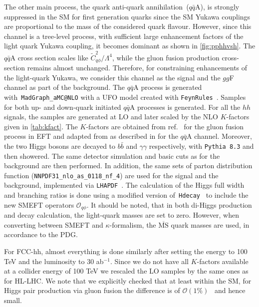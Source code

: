 The other main process, the quark anti-quark annihilation~($q\bar q$A), is strongly suppressed in the SM for first generation quarks since the SM Yukawa couplings are proportional to the mass of the considered quark flavour. However, since this channel is a tree-level process, with sufficient large enhancement factors of the light quark Yukawa coupling, it becomes dominant as shown in \autoref{fig:pphhvsh}. The $q\bar q$A cross section scales like $\tilde{C}_{q\phi}^2/\Lambda^4$,  while the gluon fusion production cross-section remains almost unchanged. Therefore, for constraining enhancements of the light-quark Yukawa, we consider this channel as the signal and the $gg$F channel as part of the background. The $q\bar q$A process is generated with~\texttt{MadGraph\_aMC@NLO} with a UFO model created with \texttt{FeynRules}~\cite{Alloul:2013bka}. Samples for both up- and down-quark initiated $q\bar q$A processes is generated. For all the $hh$ signals, the samples are generated at LO and later scaled by the NLO $K$-factors given in \autoref{tab:kfact}. The $K$-factors are obtained from ref.~\cite{Buchalla:2018yce} for the gluon fusion process in EFT and adapted from \cite{Dicus:1998hs,Balazs:1998sb, Harlander:2003ai} as described in \cite{Alasfar:2019pmn} for the $q\bar q$A channel. Moreover, the two Higgs bosons are decayed to $b\bar b$ and $\gamma\gamma$ respectively, with \texttt{Pythia 8.3} and then showered. The same detector simulation and basic cuts as for the background are then performed. In addition, the same sets of parton distribution function (\texttt{NNPDF31\_nlo\_as\_0118\_nf\_4}) are used for the signal and the background, implemented via \texttt{LHAPDF}~\cite{Buckley:2014ana}. The calculation of the Higgs full width and branching ratios is done using a modified version of~\texttt{Hdecay}~\cite{Djouadi:1997yw,Djouadi:2018xqq} to include the new SMEFT operators $\mathcal{O}_{q\phi}$. It should be noted, that in both di-Higgs production and decay calculation, the light-quark masses are set to zero. However, when converting between SMEFT and $\kappa$-formalism, the $\overline{\mathrm{MS}}$ quark masses are used, in accordance to the PDG.

For FCC-hh, almost everything is done similarly after setting the energy to 100 TeV and the luminosity to 30 ab$^{-1}$. Since we do not have all $K$-factors available at a collider energy of 100 TeV we rescaled the LO samples by the same ones as for HL-LHC. We note that we explicitly checked that at least within the SM, for Higgs pair production via gluon fusion the difference is of $\mathcal{O}(1\%)$~\cite{Maltoni:2014eza} and hence small.





